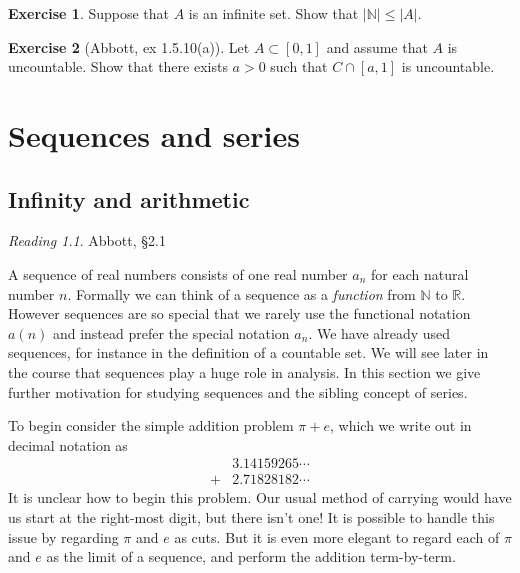 \documentclass[11pt,oneside]{amsbook}
\newcommand{\N}{\mathbb N}
\newcommand{\R}{\mathbb R}
\theoremstyle{definition}
\newtheorem{exerc}{Exercise}[section]
\theoremstyle{plain}
\theoremstyle{definition}
\theoremstyle{remark}
\newtheorem*{reading}{Reading}
\numberwithin{equation}{section}
\numberwithin{figure}{section}
\begin{document}
\begin{exerc}
  Suppose that $A$ is an infinite set. Show that $|\N|\leq|A|$.
\end{exerc}

\begin{exerc}[Abbott, ex 1.5.10(a)]
  Let $A\subset[0,1]$ and assume that $A$ is uncountable. Show that there exists $a>0$ such that $C\cap[a,1]$ is uncountable.
\end{exerc}

\chapter{Sequences and series}

\section{Infinity and arithmetic}
\label{sec:sequences}

\begin{reading}
  Abbott, \S 2.1
\end{reading}

A sequence of real numbers consists of one real number $a_n$ for each natural number $n$. Formally we can think of a sequence as a \emph{function} from $\N$ to $\R$. However sequences are so special that we rarely use the functional notation $a(n)$ and instead prefer the special notation $a_n$. We have already used sequences, for instance in the definition of a countable set. We will see later in the course that sequences play a huge role in analysis. In this section we give further motivation for studying sequences and the sibling concept of series.

To begin consider the simple addition problem $\pi+e$, which we write out in decimal notation as
\begin{align*}
&3.14159265\cdots\\
{}+&2.71828182\cdots
\end{align*}
It is unclear how to begin this problem. Our usual method of carrying would have us start at the right-most digit, but there isn't one! It is possible to handle this issue by regarding $\pi$ and $e$ as cuts. But it is even more elegant to regard each of $\pi$ and $e$ as the limit of a sequence, and perform the addition term-by-term.
\end{document}
